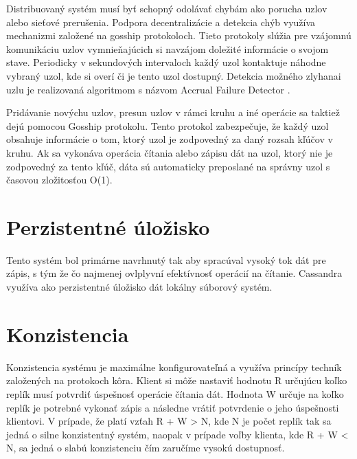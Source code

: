 \documentclass[11pt,twoside,a4paper]{book}
\begin{document}
Distribuovaný systém musí byť schopný odolávať chybám ako porucha uzlov alebo sieťové prerušenia. Podpora decentralizácie a detekcia chýb využíva mechanizmi založené na gosship protokoloch. Tieto protokoly slúžia pre vzájomnú komunikáciu uzlov vymnieňajúcich si navzájom doležité informácie o svojom stave. Periodicky v sekundových intervaloch každý uzol kontaktuje náhodne vybraný uzol, kde si overí či je tento uzol dostupný. Detekcia možného zlyhanai uzlu je realizovaná algoritmom s názvom Accrual Failure Detector \cite{accrualdetector}.

Pridávanie novýchu uzlov, presun uzlov v rámci kruhu a iné operácie sa taktiež dejú pomocou Gosship protokolu. Tento protokol zabezpečuje, že každý uzol obsahuje informácie o tom, ktorý uzol je zodpovedný za daný rozsah kľúčov v kruhu. Ak sa vykonáva operácia čítania alebo zápisu dát na uzol, ktorý nie je zodpovedný za tento kľúč, dáta sú automaticky preposlané na správny uzol s časovou zložitosťou O(1).

\section{Perzistentné úložisko}

Tento systém bol primárne navrhnutý tak aby spracúval vysoký tok dát pre zápis, s tým že čo najmenej ovlplyvní efektívnosť operácií na čítanie. Cassandra využíva ako perzistentné úložisko dát lokálny súborový systém. 

\section{Konzistencia}

Konzistencia systému je maximálne konfigurovateľná a využíva princípy techník založených na protokoch kôra. Klient si môže nastaviť hodnotu R určujúcu koľko replík musí potvrdiť úspešnosť operácie čítania dát. Hodnota W určuje na koľko replík je potrebné vykonať zápis a následne vrátiť potvrdenie o jeho úspešnosti klientovi. V prípade, že platí vzťah R + W > N, kde N je počet replík tak sa jedná o silne konzistentný systém, naopak v prípade voľby klienta, kde R + W < N, sa jedná o slabú konzistenciu čím zaručíme vysokú dostupnosť.
\end{document}

